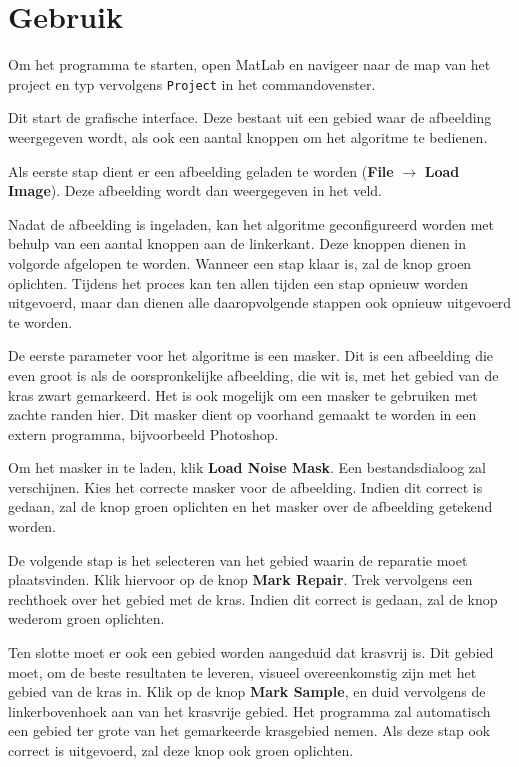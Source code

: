 \documentclass[a4paper,12pt]{article}
\begin{document}
\section{Gebruik}

Om het programma te starten, open MatLab en navigeer naar de map van het
project en typ vervolgens \texttt{Project} in het commandovenster.

Dit start de grafische interface. Deze bestaat uit een gebied waar de
afbeelding weergegeven wordt, als ook een aantal knoppen om het algoritme te
bedienen.

Als eerste stap dient er een afbeelding geladen te worden 
(\textbf{File} $\to$ \textbf{Load Image}). Deze afbeelding wordt dan
weergegeven in het veld.

Nadat de afbeelding is ingeladen, kan het algoritme geconfigureerd worden met
behulp van een aantal knoppen aan de linkerkant. Deze knoppen dienen in
volgorde afgelopen te worden. Wanneer een stap klaar is, zal de knop groen
oplichten. Tijdens het proces kan ten allen tijden een stap opnieuw worden
uitgevoerd, maar dan dienen alle daaropvolgende stappen ook opnieuw uitgevoerd
te worden.

De eerste parameter voor het algoritme is een masker. Dit is een afbeelding die
even groot is als de oorspronkelijke afbeelding, die wit is, met het gebied van
de kras zwart gemarkeerd. Het is ook mogelijk om een masker te gebruiken met
zachte randen hier. Dit masker dient op voorhand gemaakt te worden in een
extern programma, bijvoorbeeld Photoshop.

Om het masker in te laden, klik \textbf{Load Noise Mask}. Een bestandsdialoog
zal verschijnen. Kies het correcte masker voor de afbeelding. Indien dit
correct is gedaan, zal de knop groen oplichten en het masker over de afbeelding
getekend worden. 

De volgende stap is het selecteren van het gebied waarin de reparatie moet
plaatsvinden. Klik hiervoor op de knop \textbf{Mark Repair}. Trek vervolgens
een rechthoek over het gebied met de kras. Indien dit correct is gedaan, zal de
knop wederom groen oplichten.

Ten slotte moet er ook een gebied worden aangeduid dat krasvrij is. Dit gebied
moet, om de beste resultaten te leveren, visueel overeenkomstig zijn met het
gebied van de kras in. Klik op de knop \textbf{Mark Sample}, en duid vervolgens
de linkerbovenhoek aan van het krasvrije gebied. Het programma zal automatisch
een gebied ter grote van het gemarkeerde krasgebied nemen. Als deze stap ook
correct is uitgevoerd, zal deze knop ook groen oplichten.
\end{document}
